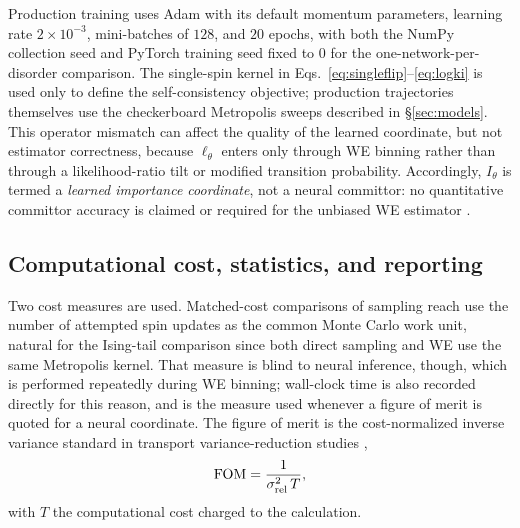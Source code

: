 \documentclass[a4paper,fleqn]{cas-sc}
\newcommand{\FOM}{\mathrm{FOM}}
\begin{document}
Production training uses Adam with its default momentum parameters, learning rate
$2\times10^{-3}$, mini-batches of $128$, and $20$ epochs, with both the NumPy collection seed
and PyTorch training seed fixed to $0$ for the one-network-per-disorder comparison.  The
single-spin kernel in Eqs.~\eqref{eq:singleflip}--\eqref{eq:logki} is used only to define the
self-consistency objective; production trajectories themselves use the checkerboard Metropolis
sweeps described in \S\ref{sec:models}.  This operator mismatch can affect the quality of the
learned coordinate, but not estimator correctness, because $\ell_\theta$ enters only through
WE binning rather than through a likelihood-ratio tilt or modified transition probability.
Accordingly, $I_\theta$ is termed a \emph{learned importance coordinate}, not a neural
committor: no quantitative committor accuracy is claimed or required for the unbiased WE
estimator \citep{zhang2010}.

\subsection{Computational cost, statistics, and reporting}\label{sec:cost}
Two cost measures are used. Matched-cost comparisons of sampling reach use the number of
attempted spin updates as the common Monte Carlo work unit, natural for the Ising-tail
comparison since both direct sampling and WE use the same Metropolis kernel. That measure is
blind to neural inference, though, which is performed repeatedly during WE binning; wall-clock
time is also recorded directly for this reason, and is the measure used whenever a figure of
merit is quoted for a neural coordinate. The figure of merit is the cost-normalized inverse
variance standard in transport variance-reduction studies \citep{spanier1969,wagnerfw2014},
\begin{equation}
\FOM=\frac{1}{\sigma_{\rm rel}^{2}\,T},
\label{eq:fom}
\end{equation}
with $T$ the computational cost charged to the calculation.
\end{document}
